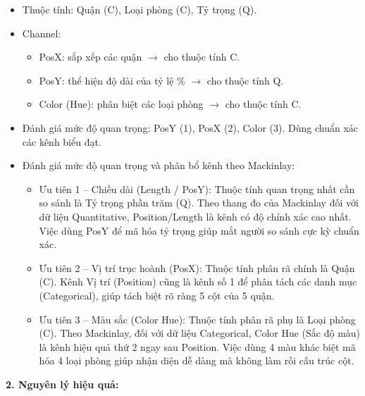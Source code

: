 \begin{itemize}
    \item Thuộc tính: Quận (C), Loại phòng (C), Tỷ trọng (Q).
    \item Channel:
    \begin{itemize}
        \item PosX: sắp xếp các quận $\rightarrow$ cho thuộc tính C.
        \item PosY: thể hiện độ dài của tỷ lệ \% $\rightarrow$ cho thuộc tính Q.
        \item Color (Hue): phân biệt các loại phòng $\rightarrow$ cho thuộc tính C.
    \end{itemize}
    \item Đánh giá mức độ quan trọng: PosY (1), PosX (2), Color (3). Dùng chuẩn xác các kênh biểu đạt.
    \item Đánh giá mức độ quan trọng và phân bổ kênh theo Mackinlay:
    \begin{itemize}
        \item Ưu tiên 1 -- Chiều dài (Length / PosY): Thuộc tính quan trọng nhất cần so sánh là Tỷ trọng phần trăm (Q). Theo thang đo của Mackinlay đối với dữ liệu Quantitative, Position/Length là kênh có độ chính xác cao nhất. Việc dùng PosY để mã hóa tỷ trọng giúp mắt người so sánh cực kỳ chuẩn xác.
        \item Ưu tiên 2 -- Vị trí trục hoành (PosX): Thuộc tính phân rã chính là Quận (C). Kênh Vị trí (Position) cũng là kênh số 1 để phân tách các danh mục (Categorical), giúp tách biệt rõ ràng 5 cột của 5 quận.
        \item Ưu tiên 3 -- Màu sắc (Color Hue): Thuộc tính phân rã phụ là Loại phòng (C). Theo Mackinlay, đối với dữ liệu Categorical, Color Hue (Sắc độ màu) là kênh hiệu quả thứ 2 ngay sau Position. Việc dùng 4 màu khác biệt mã hóa 4 loại phòng giúp nhận diện dễ dàng mà không làm rối cấu trúc cột.
    \end{itemize}
\end{itemize}

\textbf{2. Nguyên lý hiệu quả:}

